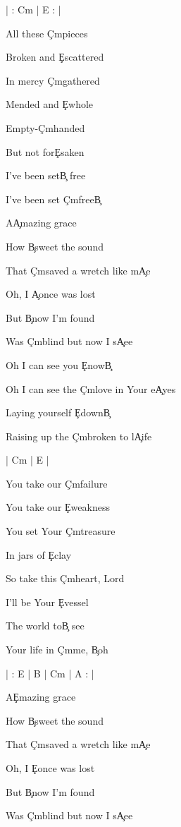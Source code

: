 \documentclass[9pt]{extarticle}
\begin{document}
\bsong

\bi[2]
| : C\s m | E : |
\ei

\bv
All these \c{C\s m}pieces

Broken and \c{E}scattered

In mercy \c{C\s m}gathered

Mended and \c{E}whole

Empty-\c{C\s m}handed

But not for\c{E}saken

I've been set\c{B} free

I've been set \c{C\s m}free\c{B}
\ev

\bp
A\c{A}mazing grace

How \c{B}sweet the sound

That \c{C\s m}saved a wretch like m\c{A}e

Oh, I \c{A}once was lost

But \c{B}now I'm found

Was \c{C\s m}blind but now I s\c{A}ee
\ep

\bc
Oh I can see you \c{E}now\c{B}

Oh I can see the \c{C\s m}love in Your e\c{A}yes

Laying yourself \c{E}down\c{B}

Raising up the \c{C\s m}broken to l\c{A}ife
\ec

\bin[2]
| C\s m | E |
\ein

\bv
You take our \c{C\s m}failure

You take our \c{E}weakness

You set Your \c{C\s m}treasure

In jars of \c{E}clay

So take this \c{C\s m}heart, Lord

I'll be Your \c{E}vessel

The world to\c{B} see

Your life in \c{C\s m}me, \c{B}oh
\ev



\bin
| : E | B | C\s m | A : |
\ein

\bp[2]
A\c{E}mazing grace

How \c{B}sweet the sound

That \c{C\s m}saved a wretch like m\c{A}e

Oh, I \c{E}once was lost

But \c{B}now I'm found

Was \c{C\s m}blind but now I s\c{A}ee
\ep


\esong
\end{document}
